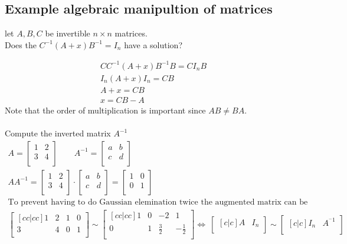 \documentclass[11pt, a4paper]{article}
\begin{document}
\subsection{Example algebraic manipultion of matrices}
let $A,B,C$ be invertible $n\times n$ matrices.\\
Does the $C^{-1}(A+x)B^{-1}=I_n$ have a solution?

\begin{gather*}
  CC^{-1}(A+x)B^{-1}B=CI_nB\\
  I_n(A+x)I_n=CB\\
  A+x = CB\\
  x = CB-A
\end{gather*}
Note that the order of multiplication is important since $AB \neq BA$.\\
\\
Compute the inverted matrix $A^{-1}$
\begin{gather*}
  A =
  \begin{bmatrix}
    1 & 2\\
    3 & 4\\
  \end{bmatrix}
  \qquad A^{-1} =
  \begin{bmatrix}
    a & b\\
    c & d\\
  \end{bmatrix}\\
  AA^{-1} =
  \begin{bmatrix}
    1 & 2\\
    3 & 4\\
  \end{bmatrix}
  \cdot
  \begin{bmatrix}
    a & b\\
    c& d\\
  \end{bmatrix}
  =
  \begin{bmatrix}
     1 & 0\\
     0 & 1\\
  \end{bmatrix}\\
  \text{To prevent having to do Gaussian elemination twice the augmented matrix can be extended:}\\
  \begin{bmatrix}[cc|cc]
    1 & 2 & 1 & 0\\
    3 & 4 & 0 & 1\\
  \end{bmatrix}
  \sim
  \begin{bmatrix}[cc|cc]
    1 & 0 & -2 & 1\\
    0 & 1 & \frac{3}{2} & -\frac{1}{2}\\
  \end{bmatrix}
  \Leftrightarrow \
  \begin{bmatrix}[c|c]A & I_n\\ \end{bmatrix} 
  \sim 
  \begin{bmatrix}[c|c]I_n & A^{^-1}\\ \end{bmatrix}
\end{gather*}
\end{document}
